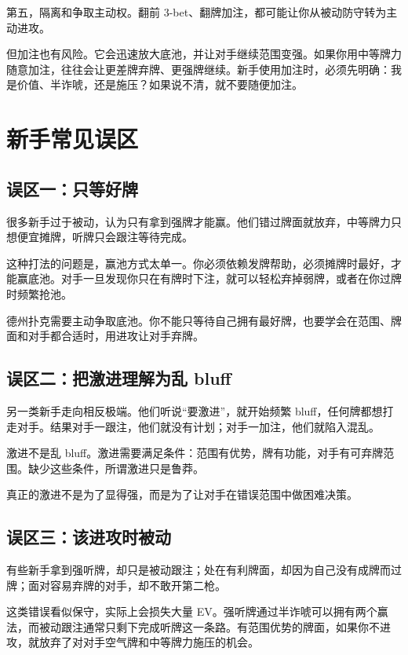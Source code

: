 第五，隔离和争取主动权。翻前 3-bet、翻牌加注，都可能让你从被动防守转为主动进攻。

但加注也有风险。它会迅速放大底池，并让对手继续范围变强。如果你用中等牌力随意加注，往往会让更差牌弃牌、更强牌继续。新手使用加注时，必须先明确：我是价值、半诈唬，还是施压？如果说不清，就不要随便加注。

\section{新手常见误区}

\subsection{误区一：只等好牌}

很多新手过于被动，认为只有拿到强牌才能赢。他们错过牌面就放弃，中等牌力只想便宜摊牌，听牌只会跟注等待完成。

这种打法的问题是，赢池方式太单一。你必须依赖发牌帮助，必须摊牌时最好，才能赢底池。对手一旦发现你只在有牌时下注，就可以轻松弃掉弱牌，或者在你过牌时频繁抢池。

德州扑克需要主动争取底池。你不能只等待自己拥有最好牌，也要学会在范围、牌面和对手都合适时，用进攻让对手弃牌。

\subsection{误区二：把激进理解为乱 bluff}

另一类新手走向相反极端。他们听说“要激进”，就开始频繁 bluff，任何牌都想打走对手。结果对手一跟注，他们就没有计划；对手一加注，他们就陷入混乱。

激进不是乱 bluff。激进需要满足条件：范围有优势，牌有功能，对手有可弃牌范围。缺少这些条件，所谓激进只是鲁莽。

真正的激进不是为了显得强，而是为了让对手在错误范围中做困难决策。

\subsection{误区三：该进攻时被动}

有些新手拿到强听牌，却只是被动跟注；处在有利牌面，却因为自己没有成牌而过牌；面对容易弃牌的对手，却不敢开第二枪。

这类错误看似保守，实际上会损失大量 EV。强听牌通过半诈唬可以拥有两个赢法，而被动跟注通常只剩下完成听牌这一条路。有范围优势的牌面，如果你不进攻，就放弃了对对手空气牌和中等牌力施压的机会。


